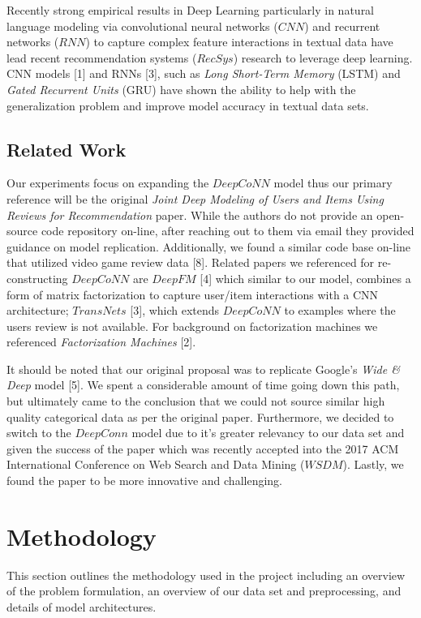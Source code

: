 \documentclass[10pt, twocolumn, letterpaper]{article}
\begin{document}
\par Recently strong empirical results in Deep Learning particularly in natural language modeling via convolutional neural networks ($CNN$) and recurrent networks ($RNN$) to capture complex feature interactions in textual data have lead recent recommendation systems ($RecSys$) research to leverage  deep learning. CNN models [1] and RNNs [3], such as \textit{Long Short-Term Memory} (LSTM) and \textit{Gated Recurrent Units} (GRU) have shown the ability to help with the generalization problem and improve model accuracy in textual data sets.

\subsection{Related Work}
Our experiments focus on expanding the $DeepCoNN$ model thus our primary reference will be the original \textit{Joint Deep Modeling of Users and Items Using Reviews for Recommendation} paper. While the authors do not provide an open-source code repository on-line, after reaching out to them via email they provided guidance on model replication. Additionally, we found a similar code base on-line that utilized video game review data [8]. Related papers we referenced for re-constructing $DeepCoNN$ are $DeepFM$ [4] which similar to our model, combines a form of matrix factorization to capture user/item interactions with a CNN architecture; $TransNets$ [3], which extends $DeepCoNN$ to examples where the users review is not available. For background on factorization machines we referenced \textit{Factorization Machines} [2].


It should be noted that our original proposal was to replicate Google's \textit{Wide \& Deep} model [5]. We spent a considerable amount of time going down this path, but ultimately came to the conclusion that we could not source similar high quality categorical data as per the original paper. Furthermore, we decided to switch to the $DeepConn$ model due to it's greater relevancy to our data set and given the success of the paper which was recently accepted into the 2017 ACM International Conference on Web Search and Data Mining ($WSDM$). Lastly, we found the paper to be more innovative and challenging.

\section{Methodology}
This section outlines the methodology used in the project including an overview of the problem formulation, an overview of our data set and preprocessing, and details of model architectures.
\end{document}
